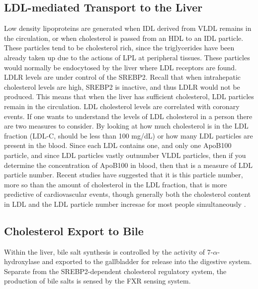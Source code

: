 \documentclass{tufte-handout}
\begin{document}
\subsection{LDL-mediated Transport to the Liver}

Low density lipoproteins are generated when IDL derived from VLDL remains in the circulation, or when cholesterol is passed from an HDL to an IDL particle.  These particles tend to be cholesterol rich, since the triglycerides have been already taken up due to the actions of LPL at peripheral tissues.  These particles would normally be endocytosed by the liver where LDL receptors are found.  LDLR levels are under control of the SREBP2.  Recall that when intrahepatic cholesterol levels are high, SREBP2 is inactive, and thus LDLR would not be produced.  This means that when the liver has sufficient cholesterol, LDL particles remain in the circulation.  LDL cholesterol levels are correlated with coronary events.  If one wants to understand the levels of LDL cholesterol in a person there are two measures to consider.  By looking at how much cholesterol is in the LDL fraction (LDL-C, should be less than 100 mg/dL) or how many LDL particles are present in the blood.  Since each LDL contains one, and only one ApoB100 particle, and since LDL particles vastly outnumber VLDL particles, then if you determine the concentration of ApoB100 in blood, then that is a measure of LDL particle number.  Recent studies have suggested that it is this particle number, more so than the amount of cholesterol in the LDL fraction, that is more predictive of cardiovascular events, though generally both the cholesterol content in LDL and the LDL particle number incresae for most people simultaneously \citep{Cromwell2007,Mora2007}.

\subsection{Cholesterol Export to Bile}

Within the liver, bile salt synthesis is controlled by the activity of 7-$\alpha$-hydroxylase and exported to the gallbladder for release into the digestive system.  Separate from the SREBP2-dependent cholesterol regulatory system, the production of bile salts is sensed by the FXR sensing system.
\end{document}
